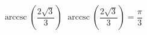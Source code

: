  {$\operatorname{arccsc} \left( \dfrac{2\sqrt{3}}{3} \right)$}
{ $\operatorname{arccsc} \left( \dfrac{2\sqrt{3}}{3} \right) = \dfrac{\pi}{3}$}
